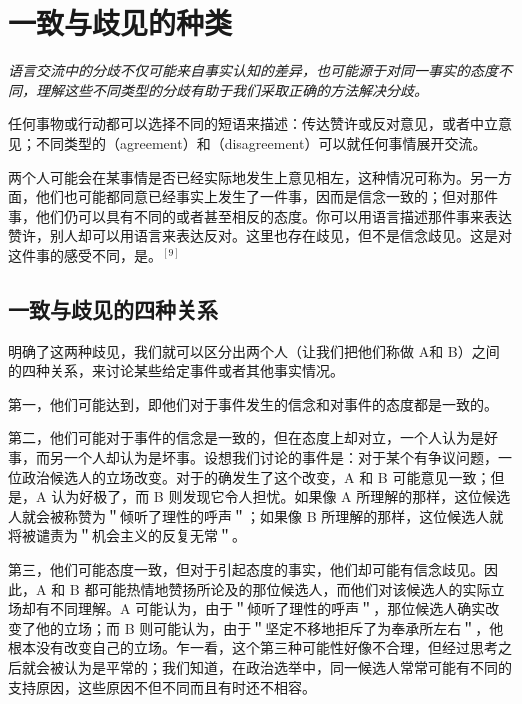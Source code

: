 \section{一致与歧见的种类}

\begin{logicbox}[title=引言]
\textit{语言交流中的分歧不仅可能来自事实认知的差异，也可能源于对同一事实的态度不同，理解这些不同类型的分歧有助于我们采取正确的方法解决分歧。}
\end{logicbox}

任何事物或行动都可以选择不同的短语来描述：传达赞许或反对意见，或者中立意见；不同类型的（agreement）和（disagreement）可以就任何事情展开交流。

\begin{theorembox}[title=两种歧见类型]
两个人可能会在某事情是否已经实际地发生上意见相左，这种情况可称为。另一方面，他们也可能都同意已经事实上发生了一件事，因而是信念一致的；但对那件事，他们仍可以具有不同的或者甚至相反的态度。你可以用语言描述那件事来表达赞许，别人却可以用语言来表达反对。这里也存在歧见，但不是信念歧见。这是对这件事的感受不同，是。$^{[9]}$
\end{theorembox}

\subsection{一致与歧见的四种关系}

明确了这两种歧见，我们就可以区分出两个人（让我们把他们称做 A和 B）之间的四种关系，来讨论某些给定事件或者其他事实情况。

第一，他们可能达到，即他们对于事件发生的信念和对事件的态度都是一致的。

第二，他们可能对于事件的信念是一致的，但在态度上却对立，一个人认为是好事，而另一个人却认为是坏事。设想我们讨论的事件是：对于某个有争议问题，一位政治候选人的立场改变。对于的确发生了这个改变，A 和 B 可能意见一致；但是，A 认为好极了，而 B 则发现它令人担忧。如果像 A 所理解的那样，这位候选人就会被称赞为＂倾听了理性的呼声＂；如果像 B 所理解的那样，这位候选人就将被谴责为＂机会主义的反复无常＂。

第三，他们可能态度一致，但对于引起态度的事实，他们却可能有信念歧见。因此，A 和 B 都可能热情地赞扬所论及的那位候选人，而他们对该候选人的实际立场却有不同理解。A 可能认为，由于＂倾听了理性的呼声＂，那位候选人确实改变了他的立场；而 B 则可能认为，由于＂坚定不移地拒斥了为奉承所左右＂，他根本没有改变自己的立场。乍一看，这个第三种可能性好像不合理，但经过思考之后就会被认为是平常的；我们知道，在政治选举中，同一候选人常常可能有不同的支持原因，这些原因不但不同而且有时还不相容。

